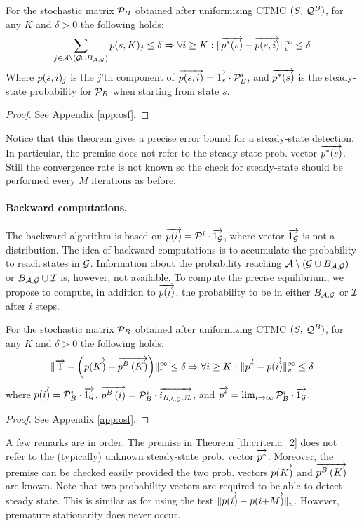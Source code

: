 \documentclass{entcs}
\begin{document}
	\begin{theorem}
		For the stochastic matrix $\mathcal{P}_{B}$ obtained after uniformizing CTMC $(S,\:\mathcal{Q}^{B})$, for any $K$ and $\delta > 0$ the following holds:
			{\small
			\[
				\sum_{j \in \mathcal{A} \setminus \left( \mathcal{G} \cup B_{ \mathcal{A}, \mathcal{G} } \right)} p(s,K)_{j} \leq \delta \Rightarrow \forall i \geq K : \lVert  \overrightarrow{p^{*}(s)} - \overrightarrow{p(s,i)}  \rVert_{v}^{\infty} \leq \delta
			 \]
			 }
		Where $p(s,i)_{j}$ is the $j$'th component of $\overrightarrow{p(s,i)} = \overrightarrow{1_{s} } \cdot \mathcal{P}_{B}^{i} $, and $\overrightarrow{p^{*}(s)}$ is the steady-state probability for $\mathcal{P}_{B}$ when starting from state $s$. \label{th:criteria_1}
	 \end{theorem}
	{\small
		\begin{proof}
			See Appendix \ref{app:osf}.
		\end{proof}
	}
	
	Notice that this theorem gives a precise error bound for a steady-state detection. In particular, the premise does not refer to the steady-state prob. vector $\overrightarrow{p^{*}(s)}$. Still the convergence rate is not known so the check for steady-state should be performed every $M$ iterations as before.
	
	\paragraph{Backward computations.}
	The backward algorithm is based on $\overrightarrow{p(i)} = \mathcal{P}^{i} \cdot \overrightarrow{1_{\mathcal{G}}}$, where vector $\overrightarrow{1_{\mathcal{G}}}$ is not a distribution. The idea of backward computations is to accumulate the probability to reach states in $\mathcal{G}$. Information about the probability reaching $\mathcal{A} \setminus \left( \mathcal{G} \cup B_{ \mathcal{A}, \mathcal{G} } \right)$ or $B_{ \mathcal{A}, \mathcal{G} } \cup \mathcal{I}$ is, however, not available. To compute the precise equilibrium, we propose to compute, in addition to $\overrightarrow{p(i)}$, the probability to be in either $B_{ \mathcal{A}, \mathcal{G} }$ or $\mathcal{I}$ after $i$ steps.
	
	\begin{theorem}
		\label{th:criteria_2}
		For the stochastic matrix $\mathcal{P}_{B}$ obtained after uniformizing CTMC $(S,\:\mathcal{Q}^{B})$, for any $K$ and $\delta > 0$ the following holds:
			{\small
			\[
				\lVert   \overrightarrow{1} - \left( \overrightarrow{p(K)} + \overrightarrow{p^{B}\left( K \right)} \right)   \rVert_{v}^{\infty} \leq \delta \Rightarrow \forall i \geq K : \lVert  \overrightarrow{p^{*}} - \overrightarrow{p(i)}  \rVert_{v}^{\infty} \leq \delta
			 \]
			 }
		where $\overrightarrow{p(i)} = \mathcal{P}_{B}^{i} \cdot \overrightarrow{1_{\mathcal{G}}}$, $\overrightarrow{p^{B}\left( i \right)} = \mathcal{P}_{B}^{i} \cdot \overrightarrow {i_{B_{ \mathcal{A}, \mathcal{G} } \cup \mathcal{I}}}$, and $\overrightarrow{p^{*}} = \lim_{i \rightarrow \infty} \mathcal{P}_{B}^{i} \cdot \overrightarrow{1_{\mathcal{G}}}$.
	\end{theorem}
	{\small
		\begin{proof}
			See Appendix \ref{app:osf}.
		\end{proof}
	}
	A few remarks are in order. The premise in Theorem \ref{th:criteria_2} does not refer to the (typically) unknown steady-state prob. vector $\overrightarrow{p^{*}}$. Moreover, the premise can be checked easily provided the two prob. vectors $\overrightarrow{p(K)}$ and $\overrightarrow{p^{B}\left( K \right)}$ are known. Note that two probability vectors are required to be able to detect steady state. This is similar as for using the test $\lVert \overrightarrow{p(i)} - \overrightarrow{p(i{+}M)} \rVert_{v}$. However, premature stationarity does never occur.
\end{document}
